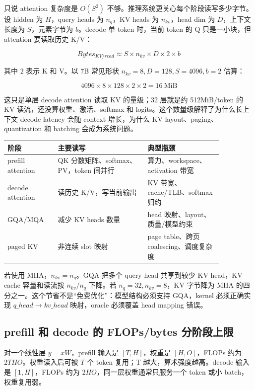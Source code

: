 只说 attention 复杂度是 \(O(S^2)\) 不够。推理系统更关心每个阶段读写多少字节。设 hidden 为 \(H\)，query heads 为 \(n_q\)，KV heads 为 \(n_{kv}\)，head dim 为 \(D\)，上下文长度为 \(S\)，元素字节为 \(b\)。decode 单 token 时，当前 token 的 Q 只是一小块，但 attention 要读取历史 K/V：

\[
Bytes_{KV/read} \approx S \times n_{kv} \times D \times 2 \times b
\]

其中 \(2\) 表示 K 和 V。以 7B 常见形状 \(n_{kv}=8, D=128, S=4096, b=2\) 估算：

\[
4096 \times 8 \times 128 \times 2 \times 2 = 16\ \mathrm{MiB}
\]

这只是单层 decode attention 读取 KV 的量级；32 层就是约 512MiB/token 的 KV 读流，还没算权重、激活、softmax 和 logits。这个数量级解释了为什么长上下文 decode latency 会随 context 增长，为什么 KV layout、paging、quantization 和 batching 会成为系统问题。

\begin{center}
\begin{tabular}{p{0.20\linewidth}p{0.36\linewidth}p{0.30\linewidth}}
\toprule
阶段 & 主要读写 & 典型瓶颈 \\
\midrule
prefill attention & QK 分数矩阵、softmax、PV，token 间并行 & 算力、workspace、activation 带宽 \\
decode attention & 读历史 K/V，写当前输出 & KV 带宽、cache/TLB、softmax 归约 \\
GQA/MQA & 减少 KV heads 数量 & head 映射、layout、质量/模型约束 \\
paged KV & 非连续 slot 映射 & page table、跨页 coalescing、调度复杂度 \\
\bottomrule
\end{tabular}
\end{center}

若使用 MHA，\(n_{kv}=n_q\)。GQA 把多个 query head 共享到较少 KV head，KV cache 容量和读流按 \(n_{kv}/n_q\) 下降。若 \(n_q=32,n_{kv}=8\)，KV 字节降为 MHA 的四分之一。这个节省不是“免费优化”：模型结构必须支持 GQA，kernel 必须正确实现 \(q\_head \rightarrow kv\_head\) 映射，oracle 必须覆盖 head mapping 错误。

\subsection{prefill 和 decode 的 FLOPs/bytes 分阶段上限}

对一个线性层 \(y = xW\)，prefill 输入是 \([T,H]\)，权重是 \([H,O]\)，FLOPs 约为 \(2THO\)。权重读入后可被 \(T\) 个 token 复用；T 越大，算术强度越高。decode 输入是 \([1,H]\)，FLOPs 约为 \(2HO\)，同一层权重通常只服务一个 token 或小 batch，权重复用弱。

